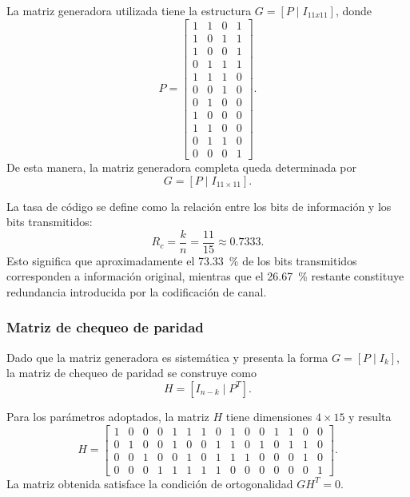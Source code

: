 La matriz generadora utilizada tiene la estructura
$G=[P\mid I_{11x11}]$, donde
\begin{equation}
P=
\left[
\begin{array}{cccc}
1&1&0&1\\
1&0&1&1\\
1&0&0&1\\
0&1&1&1\\
1&1&1&0\\
0&0&1&0\\
0&1&0&0\\
1&0&0&0\\
1&1&0&0\\
0&1&1&0\\
0&0&0&1
\end{array}
\right].
\end{equation}
De esta manera, la matriz generadora completa queda
determinada por
\begin{equation}
    G=\left[P\mid I_{11 \times 11}\right].
\end{equation}

La tasa de código se define como la relación entre
los bits de información y los bits transmitidos:
\begin{equation}
    R_c=\frac{k}{n}
    =\frac{11}{15}
    \approx 0.7333.
\end{equation}
Esto significa que aproximadamente el \qty{73.33}{\percent} de los bits
transmitidos corresponden a información original, mientras
que el \qty{26.67}{\percent} restante constituye redundancia introducida
por la codificación de canal.


\subsubsection{Matriz de chequeo de paridad}

Dado que la matriz generadora es sistemática y presenta
la forma $G=[P\mid I_k]$, la matriz de chequeo de paridad
se construye como
\begin{equation}
    H=\left[I_{n-k}\mid P^T\right].
\end{equation}

Para los parámetros adoptados, la matriz $H$ tiene
dimensiones $4\times15$ y resulta
\begin{equation}
H=
\left[
\begin{array}{cccc|ccccccccccc}
1&0&0&0&1&1&1&0&1&0&0&1&1&0&0\\
0&1&0&0&1&0&0&1&1&0&1&0&1&1&0\\
0&0&1&0&0&1&0&1&1&1&0&0&0&1&0\\
0&0&0&1&1&1&1&1&0&0&0&0&0&0&1
\end{array}
\right].
\end{equation}
La matriz obtenida satisface la condición de
ortogonalidad $GH^T=0$.


